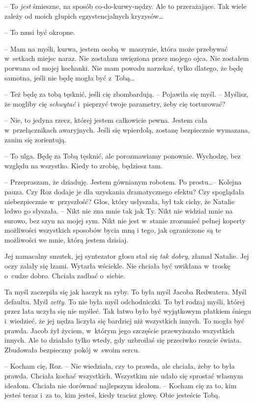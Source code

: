 \documentclass[oneside,polish,11pt,sfheadings]{mwbk}
\begin{document}
-- To \textit{jest }śmieszne, na sposób co-do-kurwy-nędzy. Ale to
przerażające. Tak wiele zależy od moich głupich egzystencjalnych
kryzysów\ldots 

-- To musi być okropne.

-- Mam na myśli, kurwa, jestem osobą w~maszynie, która może przebywać w~setkach miejsc naraz. Nie zostałam uwięziona przez mojego ojca. Nie
zostałem porwana od mojej kochanki. Nie mam powodu narzekać, tylko
dlatego, że będę samotna, jeśli nie będę mogła być z~Tobą\ldots 

-- Też będę za tobą tęsknić, jeśli cię zbombardują. -- Pojawiła się myśl.
-- Myślisz, że mogliby cię \textit{schwytać} i~pieprzyć twoje parametry,
żeby cię torturować?

-- Nie, to jedyna rzecz, której jestem całkowicie pewna. Jestem cała w~przełącznikach awaryjnych. Jeśli się wpierdolą, zostanę bezpiecznie
wymazana, zanim się zorientują.

-- To ulga. Będę za Tobą tęsknić, ale porozmawiamy ponownie. Wychodzę,
bez względu na wszystko. Kiedy to zrobię, będziesz tam.

-- Przepraszam, że dziaduję. Jestem gównianym robotem. Po prostu\ldots  -- Kolejna pauza. Czy Roz dodaje je dla uzyskania dramatycznego efektu? Czy
spoglądała niebezpiecznie w~przyszłość? Głos, który usłyszała, był tak
cichy, że Natalie ledwo go słyszała. -- Nikt nie zna mnie tak jak Ty.
Nikt nie widział mnie na surowo, bez szyn na mojej sym. Nikt nie jest w~stanie zrozumieć pełnej koperty możliwości wszystkich sposobów bycia mną
i tego, jak ograniczone są te możliwości we mnie, którą jestem dzisiaj.

Jej namacalny smutek, jej syntezator głosu stał się \textit{tak dobry},
złamał Natalie. Jej oczy zalały się łzami. Wytarła wściekle. Nie chciała
być uwikłana w~troskę o~cudze dobro. Chciała zadbać o~siebie.

Ta myśl zaczepiła się jak haczyk na ryby. To była myśl Jacoba Redwatera.
Myśl defaultu. Myśl \textit{zetty}. To nie była myśl odchodniczki. To był
rodzaj myśli, której przez lata uczyła się nie myśleć. Tak łatwo było
być wyjątkowym płatkiem śniegu i~wiedzieć, że jej nędza liczyła się
bardziej niż wszystkich innych. To mogła być prawda. Jacob żył życiem, w~którym jego szczęście przewyższało wszystkich innych. Ale to działało
tylko wtedy, gdy uzbroiłaś się przeciwko reszcie świata. Zbudowała
bezpieczny pokój w~swoim sercu.

-- Kocham cię, Roz. -- Nie wiedziała, czy to prawda, ale chciała, żeby to
była prawda. Chciała kochać wszystkich. Wszystkim nie udało się sprostać
własnym ideałom. Chciała nie dorównać najlepszym ideałom. -- Kocham cię
za to, kim jesteś teraz i~za to, kim jesteś, kiedy tracisz głowę. Obie
jesteście Tobą.
\end{document}
